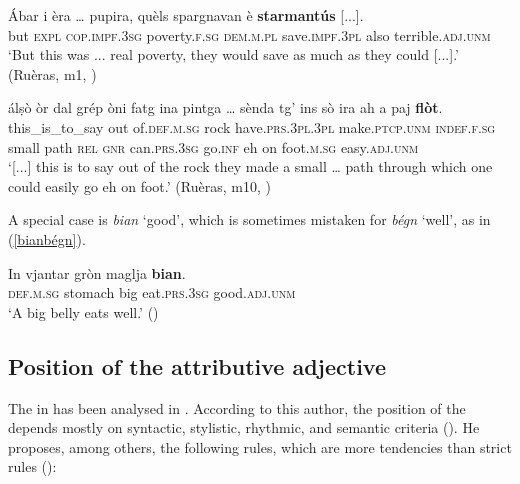 \ea\label{ex:adjadv2}
\gll   Ábar i èra … pupira, quèls spargnavan è \textbf{starmantús} [...].\\
but \textsc{expl}  \textsc{cop.impf.3sg} {} poverty.\textsc{f.sg} \textsc{dem.m.pl} save.\textsc{impf.3pl} also terrible.\textsc{adj.unm}\\
\glt `But this was ... real poverty, they would save as much as they could [...].' (Ruèras, m1, )
\z

\ea\label{ex:adjadv3}
\gll  [...] álṣò òr dal grép òni fatg ina pintga …  sènda tg’ ins sò ira ah a paj \textbf{flòt}.\\
{} this\_is\_to\_say out of.\textsc{def.m.sg} rock have.\textsc{prs.3pl.3pl} make.\textsc{ptcp.unm} \textsc{indef.f.sg} small {} path \textsc{rel} \textsc{gnr} can.\textsc{prs.3sg} go.\textsc{inf} eh on foot.\textsc{m.sg} easy.\textsc{adj.unm} \\
\glt `[...] this is to say out of the rock they made a small … path through which one could easily go eh on foot.' (Ruèras, m10, )
\z

A special case is \textit{bian} `good', which is sometimes mistaken for \textit{bégn} `well', as in (\ref{bianbégn}).

\ea\label{bianbégn}
\gll  In vjantar gròn maglja \textbf{bian}. \\
     \textsc{def.m.sg} stomach big eat.\textsc{prs.3sg} good.\textsc{adj.unm} \\
\glt `A big belly eats well.' ()
\z

\subsection{Position of the attributive adjective}\label{sec:3.3.6}
The  in  has been analysed in \citet{Winzap1981}. According to this author, the position of the  depends mostly on syntactic, stylistic, rhythmic, and semantic criteria (\citealt[1]{Winzap1981}). He proposes, among others, the following rules, which are more tendencies than strict rules (\citealt[3ff.]{Winzap1981}): 

